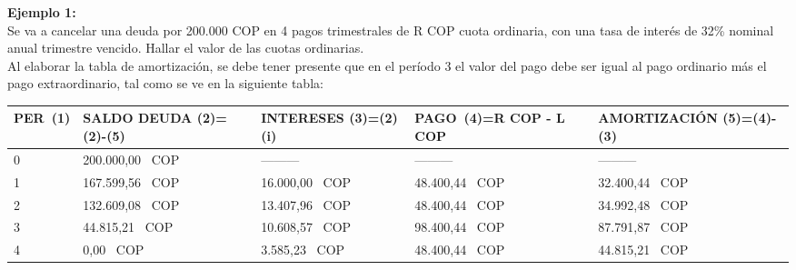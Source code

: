 \textbf{Ejemplo 1:}\\

Se va a cancelar una deuda por 200.000 COP en 4 pagos trimestrales de R COP cuota ordinaria, con una tasa de interés de 32\% nominal anual trimestre vencido. Hallar el valor de las cuotas ordinarias.\\





Al elaborar la tabla de amortización, se debe tener presente que en el período 3 el valor del pago debe ser igual al pago ordinario más el pago extraordinario, tal como se ve en la siguiente tabla:\\


\begin{spacing}{1.1}
	\begin{tabular}{|p{1cm}|p{3cm}|p{3cm}|p{3cm}|p{3cm}|}
		\hline
		\textbf{PER\ (1)} & \textbf{SALDO DEUDA (2)=(2)-(5)} & \textbf{INTERESES  (3)=(2)(i)} & \textbf{PAGO\ (4)=R COP - L COP} & \textbf{AMORTIZACIÓN  (5)=(4)-(3)} \\ \hline                    0 &   200.000,00 \ COP & --------- & --------- & ---------\\ \hline
		1                 &  167.599,56 \ COP                     &  16.000,00 \ COP                    &   48.400,44 \ COP                &  32.400,44 \ COP                        \\ \hline
		2                 &  132.609,08 \ COP                     &   13.407,96 \ COP                    &   48.400,44 \ COP                 &  34.992,48 \ COP                        \\ \hline
		3                 &  44.815,21 \ COP                      &  10.608,57 \ COP                     &    98.400,44 \ COP                 &  87.791,87 \ COP                        \\ \hline
		4                 &  0,00 \ COP                           &  3.585,23 \ COP                      &   48.400,44 \ COP                &  44.815,21 \ COP                        \\ \hline
	\end{tabular}
\end{spacing}
